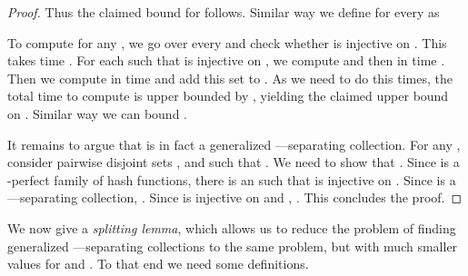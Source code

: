 \begin{proof}
Thus the claimed bound for  follows. 
Similar way we define  for every  as 


To compute  for any , we go over every  and check whether  is injective on . This takes time . 
For each  such that  is injective on , we compute  and then  in time . Then we compute   in time 
 and add this set to . As we need to do this  times, the total time 
to compute  is upper bounded by , 
yielding the claimed upper bound on . Similar way we can bound .

It remains to argue that  is in fact a generalized ---separating collection. For any , consider pairwise disjoint sets , and 
 such that . We need to show that . 
Since  is a -perfect family of hash functions, there is an  such that  is injective on . 
Since  is a ---separating collection,  
. Since  is injective on  and , . 
This concludes the proof.
\end{proof}
We now give a {\em splitting lemma}, which allows us to reduce the problem of finding generalized ---separating collections to the same problem, but with much smaller values for  and . To that end we need some definitions.


